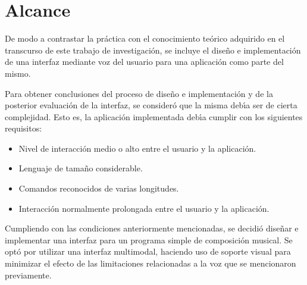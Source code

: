 \section{Alcance}
\label{sec:problema-especifico}

De modo a contrastar la pr\'actica con el conocimiento te\'orico adquirido en
el transcurso de este trabajo de investigaci\'on, se incluye el dise\~no e implementaci\'on de
una interfaz mediante voz del usuario para una aplicaci\'on como parte del mismo.

Para obtener conclusiones del proceso de dise\~no e implementaci\'on y de la posterior evaluaci\'on
de la interfaz, se consider\'o que la misma deb{\'\i}a ser de cierta complejidad. Esto es, la
aplicaci\'on implementada deb{\'\i}a cumplir con los siguientes requisitos:

\begin{itemize}
     \item Nivel de interacci\'on medio o alto entre el usuario y la aplicaci\'on.
     \item Lenguaje de tama\~no considerable.
     \item Comandos reconocidos de varias longitudes.
     \item Interacci\'on normalmente prolongada entre el usuario y la aplicaci\'on.
 \end{itemize} 

Cumpliendo con las condiciones anteriormente mencionadas, se decidi\'o dise\~nar e implementar 
una interfaz para un programa simple de composici\'on musical.
Se opt\'o por utilizar una interfaz multimodal, 
haciendo uso de soporte visual para minimizar el efecto de las limitaciones
relacionadas a la voz que se mencionaron previamente.

